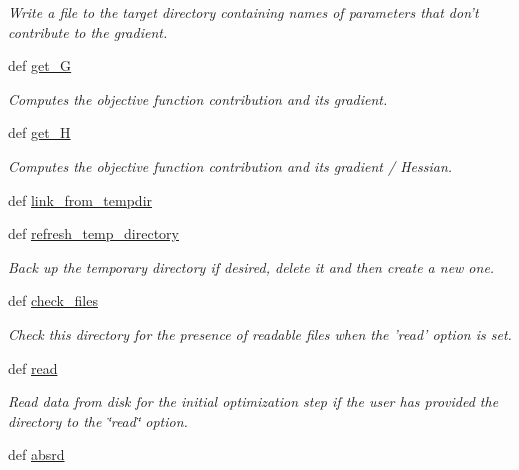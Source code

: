 \begin{DoxyCompactItemize}
\begin{DoxyCompactList}\small\item\em Write a file to the target directory containing names of parameters that don't contribute to the gradient. \end{DoxyCompactList}\item 
def \hyperlink{classforcebalance_1_1target_1_1Target_afa8cc38c8bba8861c072e789717aa049}{get\-\_\-\-G}
\begin{DoxyCompactList}\small\item\em Computes the objective function contribution and its gradient. \end{DoxyCompactList}\item 
def \hyperlink{classforcebalance_1_1target_1_1Target_a1d2ee27fe86a09769c1816af23b09adb}{get\-\_\-\-H}
\begin{DoxyCompactList}\small\item\em Computes the objective function contribution and its gradient / Hessian. \end{DoxyCompactList}\item 
def \hyperlink{classforcebalance_1_1target_1_1Target_a5aa4958cea0a48138511567a076c5a82}{link\-\_\-from\-\_\-tempdir}
\item 
def \hyperlink{classforcebalance_1_1target_1_1Target_afe815eafab06ac92f10bbf4b88ad95c8}{refresh\-\_\-temp\-\_\-directory}
\begin{DoxyCompactList}\small\item\em Back up the temporary directory if desired, delete it and then create a new one. \end{DoxyCompactList}\item 
def \hyperlink{classforcebalance_1_1target_1_1Target_ac790529c5f85f0547fe3601ad1cf2419}{check\-\_\-files}
\begin{DoxyCompactList}\small\item\em Check this directory for the presence of readable files when the 'read' option is set. \end{DoxyCompactList}\item 
def \hyperlink{classforcebalance_1_1target_1_1Target_afb87b4d33b88bb381c74b76752c5892a}{read}
\begin{DoxyCompactList}\small\item\em Read data from disk for the initial optimization step if the user has provided the directory to the \char`\"{}read\char`\"{} option. \end{DoxyCompactList}\item 
def \hyperlink{classforcebalance_1_1target_1_1Target_abb0a6089d8deaead8f78186cc8e4cbe4}{absrd}

\end{DoxyCompactItemize}
